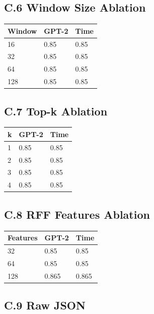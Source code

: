 \subsection{C.6 Window Size Ablation}

\begin{table}[H]
\centering
\small
\begin{tabular}{lll}
\toprule
\textbf{Window} & \textbf{GPT-2} & \textbf{Time} \\
\midrule
16 & 0.85 & 0.85 \\
32 & 0.85 & 0.85 \\
64 & 0.85 & 0.85 \\
128 & 0.85 & 0.85 \\
\bottomrule
\end{tabular}
\end{table}

\subsection{C.7 Top-k Ablation}

\begin{table}[H]
\centering
\small
\begin{tabular}{lll}
\toprule
\textbf{k} & \textbf{GPT-2} & \textbf{Time} \\
\midrule
1 & 0.85 & 0.85 \\
2 & 0.85 & 0.85 \\
3 & 0.85 & 0.85 \\
4 & 0.85 & 0.85 \\
\bottomrule
\end{tabular}
\end{table}

\subsection{C.8 RFF Features Ablation}

\begin{table}[H]
\centering
\small
\begin{tabular}{lll}
\toprule
\textbf{Features} & \textbf{GPT-2} & \textbf{Time} \\
\midrule
32 & 0.85 & 0.85 \\
64 & 0.85 & 0.85 \\
128 & 0.865 & 0.865 \\
\bottomrule
\end{tabular}
\end{table}

\subsection{C.9 Raw JSON}

